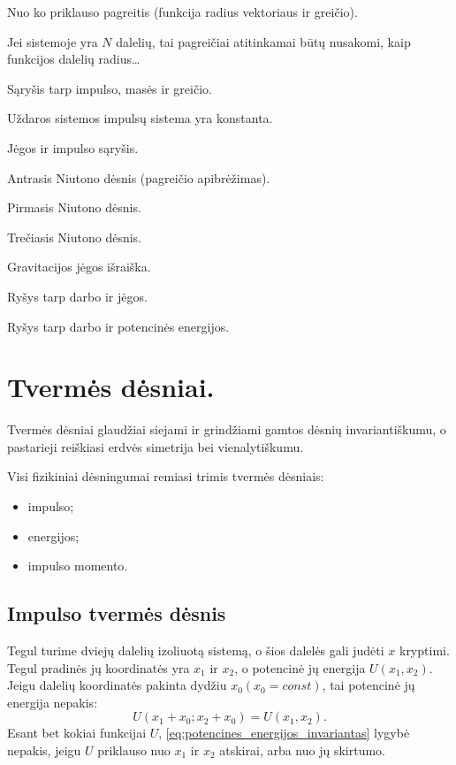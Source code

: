\begin{remember}
  \item Nuo ko priklauso pagreitis (funkcija radius vektoriaus ir greičio).
  \item Jei sistemoje yra $N$ dalelių, tai pagreičiai atitinkamai būtų
    nusakomi, kaip funkcijos dalelių radius…
  \item Sąryšis tarp impulso, masės ir greičio.
  \item Uždaros sistemos impulsų sistema yra konstanta.
  \item Jėgos ir impulso sąryšis.
  \item Antrasis Niutono dėsnis (pagreičio apibrėžimas).
  \item Pirmasis Niutono dėsnis.
  \item Trečiasis Niutono dėsnis.
  \item Gravitacijos jėgos išraiška.
  \item Ryšys tarp darbo ir jėgos.
  \item Ryšys tarp darbo ir potencinės energijos.
\end{remember}

\section{Tvermės dėsniai.}

Tvermės dėsniai glaudžiai siejami ir grindžiami gamtos dėsnių
invariantiškumu, o pastarieji reiškiasi erdvės simetrija bei
vienalytiškumu.

Visi fizikiniai dėsningumai remiasi trimis tvermės dėsniais:
\begin{itemize}
  \item impulso;
  \item energijos;
  \item impulso momento.
\end{itemize}

\subsection{Impulso tvermės dėsnis}

Tegul turime dviejų dalelių izoliuotą sistemą, o šios dalelės gali
judėti $x$ kryptimi. Tegul pradinės jų koordinatės yra $x_{1}$ ir
$x_{2}$, o potencinė jų energija $U(x_{1}, x_{2})$. Jeigu dalelių
koordinatės pakinta dydžiu $x_{0} (x_{0} = const)$, tai potencinė
jų energija nepakis:
\begin{equation}
  U(x_{1} + x_{0}; x_{2}+x_{0}) = U(x_{1},x_{2}).
  \label{eq:potencines_energijos_invariantas}
\end{equation}
Esant bet kokiai funkcijai $U$,
\ref{eq:potencines_energijos_invariantas} lygybė nepakis, jeigu
$U$ priklauso nuo $x_{1}$ ir $x_{2}$ atskirai, arba nuo
jų skirtumo.

